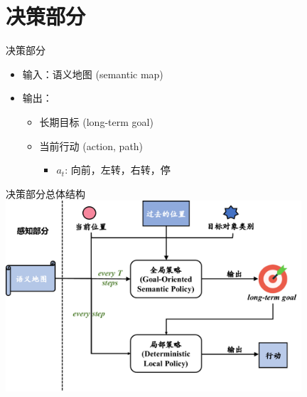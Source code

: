 \section{决策部分}
\label{sec:policy}
\begin{frame}{决策部分}
    \begin{itemize}
        \item 输入：语义地图 (semantic map)
        \item 输出：
            \begin{itemize}
                \item 长期目标 (long-term goal)
                \item 当前行动 (action, path)
                \begin{itemize}
                    \item $a_t$: 向前，左转，右转，停
                \end{itemize}
            \end{itemize}
    \end{itemize}
\end{frame}


\begin{frame}{决策部分总体结构}
    \centering
    \includegraphics[width=11cm]{assets/policy_structure.pdf}
\end{frame}